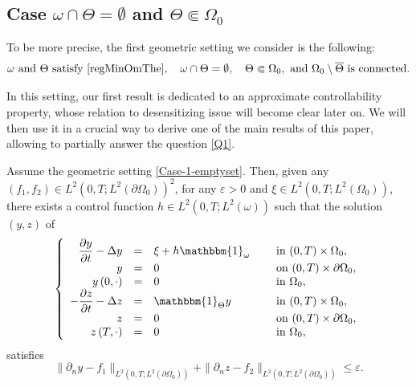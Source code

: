 \subsection*{Case \texorpdfstring{$\omega \cap \Theta = \emptyset$ and $\Theta \Subset \Omega_0$}{caseo}}

To be more precise, the first geometric setting we consider is the following:
\begin{equation}
\label{Case-1-emptyset}
\omega\text{ and }\Theta\text{ satisfy }\eqref{regMinOmThe},\quad
\omega \cap \Theta = \emptyset,
\quad \Theta \Subset \Omega_0,
\text{ and } \Omega_0 \setminus \overline\Theta \text{ is connected}.
\end{equation}

In this setting, our first result is dedicated to an approximate controllability property, whose relation to desensitizing issue will become clear later on. We will then use it in a crucial way to derive one of the main results of this paper, allowing to partially answer the question \ref{Q1}.

\begin{proposition}
\label{Prop-Approx-Cont-Case1}
Assume the geometric setting \eqref{Case-1-emptyset}. Then, given any $(f_1, f_2) \in L^2(0,T; L^2(\partial \Omega_0))^2$, for any $\varepsilon >0$ and $\xi \in L^2(0,T; L^2(\Omega_0))$, there exists a control function $h \in L^2(0,T; L^2(\omega))$ such that the solution $(y,z)$ of
\begin{equation}
\label{Coupled-Heat-Approx}
\left\{
\begin{array}{rcll}
\dfrac{\partial y}{\partial t}-\Delta y &=&\xi +h\mathbbm{1}_{\omega}\quad&\text{ in }(0,T) \times \Omega_0,
\\
y &=& 0 &\text{ on }(0,T) \times \partial \Omega_0,
\\
y\left(0,\cdot\right) &=& 0 &\text{ in }\Omega_0,
\\
-\dfrac{\partial z}{\partial t}-\Delta z &=&\mathbbm{1}_{\Theta}y &\text{ in }(0,T) \times \Omega_0,
\\
z &=& 0 &\text{ on }(0,T) \times \partial \Omega_0,
\\
z\left(T,\cdot\right) &=& 0 &\text{ in }\Omega_0,
\end{array}
\right.
\end{equation}
satisfies
\begin{equation}
\label{Approx-Cont}
\| \partial_n y - f_1 \|_{L^2(0,T; L^2(\partial\Omega_0))}
+
\| \partial_n z - f_2 \|_{L^2(0,T; L^2(\partial\Omega_0))}
\leq
\varepsilon.
\end{equation}
\end{proposition}

